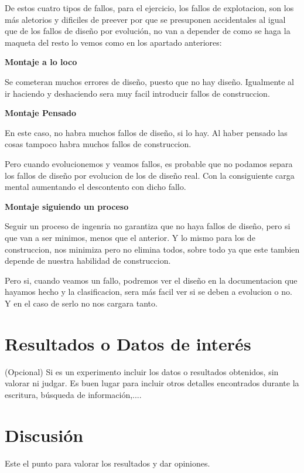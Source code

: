 De estos cuatro tipos de fallos, para el ejercicio, los fallos de explotacion, son los más aletorios y dificiles de preever por que se presuponen accidentales al igual que de los fallos de diseño por evolución, no van a depender de como se haga la maqueta del resto lo vemos como en los apartado anteriores:


\begin{multicols}{3}
	\textbf{Montaje a lo loco}
	
	Se cometeran muchos errores de diseño, puesto que no hay diseño. Igualmente al ir haciendo y deshaciendo sera muy facil introducir fallos de construccion.
	
	\columnbreak
	
	\textbf{Montaje Pensado}
	
	En este caso, no habra muchos fallos de diseño, si lo hay. Al haber pensado las cosas tampoco habra muchos fallos de construccion.
	
	Pero cuando evolucionemos y veamos fallos, es probable que no podamos separa los fallos de diseño por evolucion de los de diseño real. Con la consiguiente carga mental aumentando el descontento con dicho fallo.
	
	\columnbreak
	
	\textbf{Montaje siguiendo un proceso}
	
	Seguir un proceso de ingenria no garantiza que no haya fallos de diseño, pero si que van a ser minimos, menos que el anterior. Y lo mismo para los de construccion, nos minimiza pero no elimina todos, sobre todo ya que este tambien depende de nuestra habilidad de construccion.
	
	Pero si, cuando veamos un fallo, podremos ver el diseño en la documentacion que hayamos hecho y la clasificacion, sera más facil ver si se deben a evolucion o no. Y en el caso de serlo no nos cargara tanto.
	
\end{multicols}

\section{Resultados o Datos de interés}(Opcional)
Si es un experimento incluir los datos o resultados obtenidos, sin valorar ni judgar. Es buen lugar para incluir otros detalles encontrados durante la escritura, búsqueda de información,....
\section{Discusión}
Este el punto para valorar los resultados y dar opiniones.
